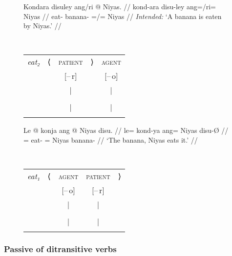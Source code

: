 \begin{figure}
\pex\label{ex:passzn2}
\a\label{ex:passzn2_inst}%
\ljudge*%
\begin{minipage}[t]{.5\remaining}
\begingl
	\gla Kondara disuley ang/ri @ Niyas. //
	\glb kond-ara disu-ley ang=/ri= Niyas //
	\glc eat-\TsgI{} banana-\PargI{} \Aarg{}=/\Ins{}= Niyas //
	\glft \textit{Intended:} `A banana is eaten by Niyas.' //
\endgl
\end{minipage}
~
\begin{tabular}[t]{>{\itshape}l l c r c}
eat₂
	& ⟨
	& \textsc{patient}
	& ⟩
	& \textsc{agent}
	\\
%
	& %
	& [–\,r]
	& %
	& [–\,o]
	\\

%
	& %
	& |
	& %
	& |
	\\

%
	& %
	& \Subj
	& %
	& \Adjc
	\\

%
	& %
	& |
	& %
	& |
	\\

%
	& %
	& \fw{banana}
	& %
	& \fw{Niyas}
	\\
\end{tabular}

\a\label{ex:passzn2_pt}%
\begin{minipage}[t]{.5\remaining}
\begingl
	\gla Le @ konja ang @ Niyas disu. //
	\glb le= kond-ya ang= Niyas disu-Ø //
	\glc \PatT{}= eat-\TsgM{} \Aarg{}= Niyas banana-\Top{} //
	\glft `The banana, Niyas eats it.' //
\endgl
\end{minipage}
~
\begin{tabular}[t]{>{\itshape}l l c c r}
eat₁
	& ⟨
	& \textsc{agent}
	& \textsc{patient}
	& ⟩
	\\
%
	& %
	& [–\,o]
	& [–\,r]
	& %
	\\

%
	& %
	& |
	& |
	& %
	\\

%
	& %
	& \Subj
	& \Obj*
	& %
	\\

%
	& %
	& |
	& |
	& %
	\\

%
	& %
	& \fw{Niyas}
	& \fw{banana}
	& %
	\\
\end{tabular}

\xe
\end{figure}

\subsubsection{Passive of ditransitive verbs}

